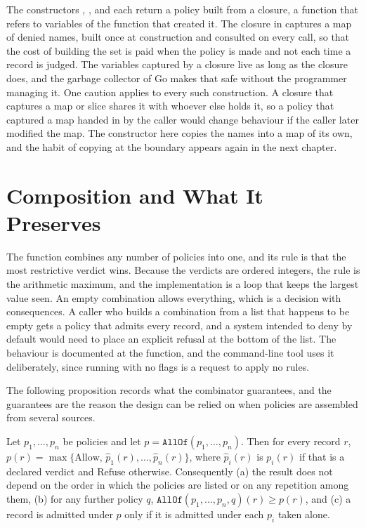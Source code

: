 The constructors , , and  each return a policy built from a closure, a function that refers to variables of the function that created it. The closure in  captures a map of denied names, built once at construction and consulted on every call, so that the cost of building the set is paid when the policy is made and not each time a record is judged. The variables captured by a closure live as long as the closure does, and the garbage collector of Go makes that safe without the programmer managing it. One caution applies to every such construction. A closure that captures a map or slice shares it with whoever else holds it, so a policy that captured a map handed in by the caller would change behaviour if the caller later modified the map. The constructor here copies the names into a map of its own, and the habit of copying at the boundary appears again in the next chapter.

\section{Composition and What It Preserves}

The function  combines any number of policies into one, and its rule is that the most restrictive verdict wins. Because the verdicts are ordered integers, the rule is the arithmetic maximum, and the implementation is a loop that keeps the largest value seen. An empty combination allows everything, which is a decision with consequences. A caller who builds a combination from a list that happens to be empty gets a policy that admits every record, and a system intended to deny by default would need to place an explicit refusal at the bottom of the list. The behaviour is documented at the function, and the command-line tool uses it deliberately, since running  with no flags is a request to apply no rules.

The following proposition records what the combinator guarantees, and the guarantees are the reason the design can be relied on when policies are assembled from several sources.

\begin{proposition}\label{prop:allof}
Let $p_1,\ldots,p_n$ be policies and let $p = \texttt{AllOf}(p_1,\ldots,p_n)$. Then for every record $r$, $p(r) = \max\{\mathrm{Allow},\, \hat p_1(r), \ldots, \hat p_n(r)\}$, where $\hat p_i(r)$ is $p_i(r)$ if that is a declared verdict and $\mathrm{Refuse}$ otherwise. Consequently (a) the result does not depend on the order in which the policies are listed or on any repetition among them, (b) for any further policy $q$, $\texttt{AllOf}(p_1,\ldots,p_n,q)(r) \ge p(r)$, and (c) a record is admitted under $p$ only if it is admitted under each $p_i$ taken alone.
\end{proposition}

